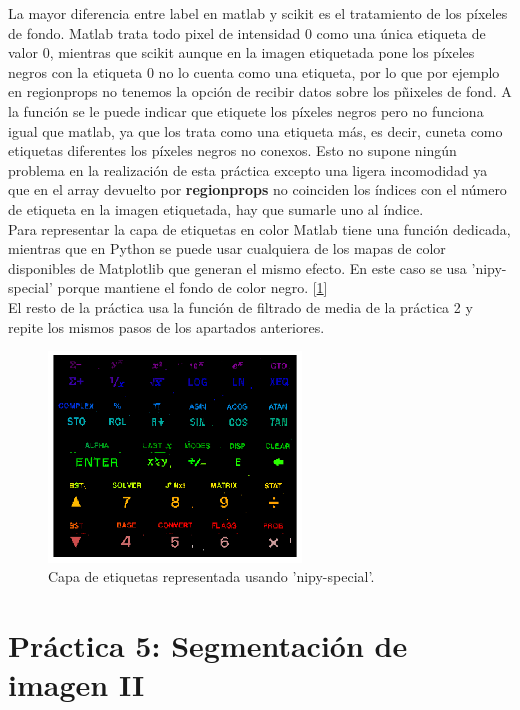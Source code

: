 \documentclass[a4paper,12pt]{report}
\begin{document}
La mayor diferencia entre label en matlab y scikit es el tratamiento de los píxeles de fondo. Matlab trata todo pixel de intensidad 0 como una única etiqueta de valor 0, mientras que scikit aunque en la imagen etiquetada pone los píxeles negros con la etiqueta 0 no lo cuenta como una etiqueta, por lo que por ejemplo en regionprops no tenemos la opción de recibir datos sobre los pñixeles de fond. A la función se le puede indicar que etiquete los píxeles negros pero no funciona igual que matlab, ya que los trata como una etiqueta más, es decir, cuneta como etiquetas diferentes los píxeles negros no conexos. Esto no supone ningún problema en la realización de esta práctica excepto una ligera incomodidad ya que en el array devuelto por \textbf{regionprops} no coinciden los índices con el número de etiqueta en la imagen etiquetada, hay que sumarle uno al índice.\\

Para representar la capa de etiquetas en color Matlab tiene una función dedicada, mientras que en Python se puede usar cualquiera de los mapas de color disponibles de Matplotlib que generan el mismo efecto. En este caso se usa 'nipy-special' porque mantiene el fondo de color negro. [\ref{color}]\\

El resto de la práctica usa la función de filtrado de media de la práctica 2 y repite los mismos pasos de los apartados anteriores.

\begin{figure}[h]
\centering
\includegraphics[width=0.6\textwidth]{imagenes/color}
\caption{Capa de etiquetas representada usando 'nipy-special'.}
\label{color}
\end{figure}


\section{ Práctica 5: Segmentación de imagen II}
\end{document}
